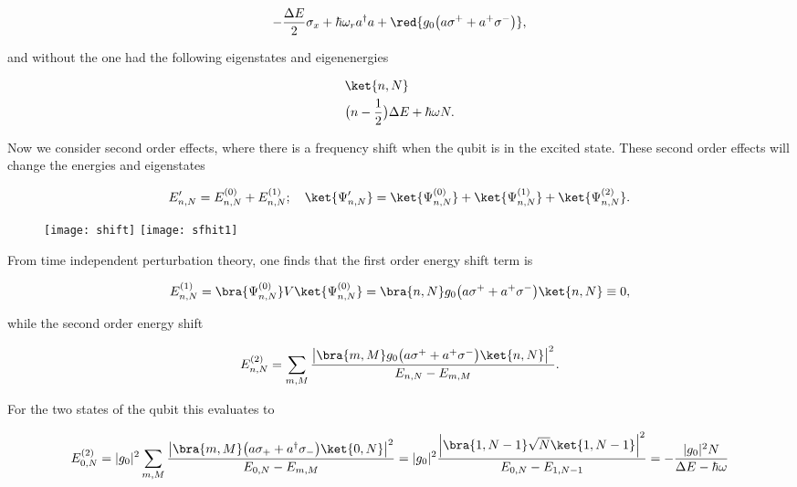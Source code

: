 \begin{equation}\label{sec}
  -\frac{\Delta E}{2}\sigma_x + \hbar\omega_ra^{\dagger}a + \red{g_0\big(a\sigma^{+}+a^{+}\sigma^{-}\big)},
\end{equation}

\noindent and without  the  one  had the following
eigenstates and eigenenergies

\begin{equation}\label{secStates}
  \begin{aligned}
    &\ket{n,N}\\
    &\big(n-\frac{1}{2}\big)\Delta E + \hbar\omega N.
  \end{aligned}
\end{equation}

\noindent  Now  we consider  second  order  effects,  where there  is  a
frequency shift  when the qubit is  in the excited state.   These second
order effects will change the energies and eigenstates

\begin{equation}\label{secEi}
  E'_{n,N} = E_{n,N}^{(0)} + E_{n,N}^{(1)};\quad \ket{\Psi'_{n,N}}=\ket{\Psi^{(0)}_{n,N}}+\ket{\Psi^{(1)}_{n,N}}+\ket{\Psi^{(2)}_{n,N}}.
\end{equation}


\begin{figure}[h]
  \centering%
  \texttt{[image: shift]}
  \texttt{[image: sfhit1]}
\end{figure}

\noindent From time independent perturbation  theory, one finds that the
first order energy shift term is

\begin{equation}\label{sec1st}
  E_{n,N}^{(1)} = \bra{\Psi^{(0)}_{n,N}}V\ket{\Psi^{(0)}_{n,N}} = \bra{n,N}g_0\big(a\sigma^{+}+a^{+}\sigma^{-}\big)\ket{n,N} \equiv 0,
\end{equation}

\noindent while the second order energy shift

\begin{equation}\label{sec2nd}
  E_{n,N}^{(2)} = \sum_{m,M}\frac{\left|\bra{m,M}g_0\big(a\sigma^{+}+a^{+}\sigma^{-}\big)\ket{n,N}\right|^2}{E_{n,N}-E_{m,M}}.
\end{equation}

\noindent For the two states of the qubit this evaluates to

\begin{equation}\label{sec0}
  E_{0,N}^{(2)} = |g_0|^2\sum_{m,M}\frac{\left|\bra{m,M}\big(a\sigma_{+}+a^{\dagger}\sigma_{-}\big)\ket{0,N}\right|^2}{E_{0,N}-E_{m,M}}= |g_0|^2\frac{\left|\bra{1,N-1}\sqrt{N}\ket{1,N-1}\right|^2}{E_{0,N}-E_{1,N-1}} = -\frac{|g_0|^2N}{\Delta E - \hbar\omega}
\end{equation}

